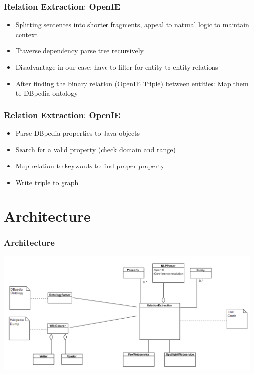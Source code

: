 \documentclass{beamer}
\begin{document}

\begin{frame}
\frametitle{Relation Extraction: OpenIE }
\begin{itemize}
	\item Splitting sentences into shorter fragments, appeal to natural logic to maintain context
	\item Traverse dependency parse tree recursively \cite{p1}
	\item Disadvantage in our case: have to filter for entity to entity relations 
	\item After finding the binary relation (OpenIE Triple) between entities: Map them to DBpedia ontology
\end{itemize}
\end{frame}


\begin{frame}
\frametitle{Relation Extraction: OpenIE }
\begin{itemize}
	\item Parse DBpedia properties to Java objects
	\item Search for a valid property (check domain and range)
	\item Map relation to keywords to find proper property 
	\item Write triple to graph
\end{itemize}
\end{frame}


\section{Architecture}

\begin{frame}
\frametitle{Architecture}
\begin{center}
	\includegraphics[scale=0.43]{architecture.PNG}
\end{center}
\end{frame}
\end{document}
